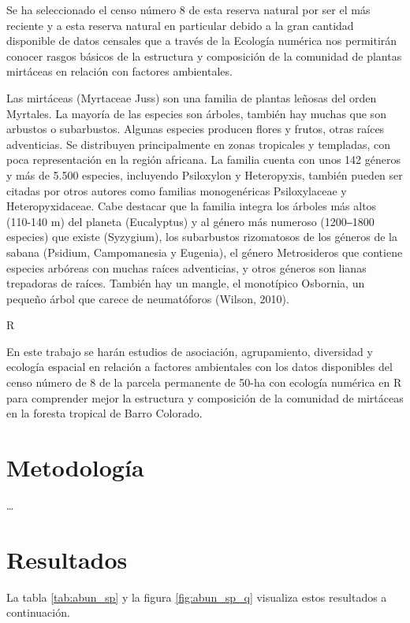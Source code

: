 \documentclass[11pt,]{article}
\begin{document}
Se ha seleccionado el censo número 8 de esta reserva natural por ser el
más reciente y a esta reserva natural en particular debido a la gran
cantidad disponible de datos censales que a través de la Ecología
numérica nos permitirán conocer rasgos básicos de la estructura y
composición de la comunidad de plantas mirtáceas en relación con
factores ambientales.

Las mirtáceas (Myrtaceae Juss) son una familia de plantas leñosas del
orden Myrtales. La mayoría de las especies son árboles, también hay
muchas que son arbustos o subarbustos. Algunas especies producen flores
y frutos, otras raíces adventicias. Se distribuyen principalmente en
zonas tropicales y templadas, con poca representación en la región
africana. La familia cuenta con unos 142 géneros y más de 5.500
especies, incluyendo Psiloxylon y Heteropyxis, también pueden ser
citadas por otros autores como familias monogenéricas Psiloxylaceae y
Heteropyxidaceae. Cabe destacar que la familia integra los árboles más
altos (110-140 m) del planeta (Eucalyptus) y al género más numeroso
(1200‒1800 especies) que existe (Syzygium), los subarbustos rizomatosos
de los géneros de la sabana (Psidium, Campomanesia y Eugenia), el género
Metrosideros que contiene especies arbóreas con muchas raíces
adventicias, y otros géneros son lianas trepadoras de raíces. También
hay un mangle, el monotípico Osbornia, un pequeño árbol que carece de
neumatóforos (Wilson, 2010).

R

En este trabajo se harán estudios de asociación, agrupamiento,
diversidad y ecología espacial en relación a factores ambientales con
los datos disponibles del censo número de 8 de la parcela permanente de
50-ha con ecología numérica en R para comprender mejor la estructura y
composición de la comunidad de mirtáceas en la foresta tropical de Barro
Colorado.

\section{Metodología}\label{metodologuxeda}

\ldots

\section{Resultados}\label{resultados}

La tabla \ref{tab:abun_sp} y la figura \ref{fig:abun_sp_q} visualiza
estos resultados a continuación.
\end{document}
